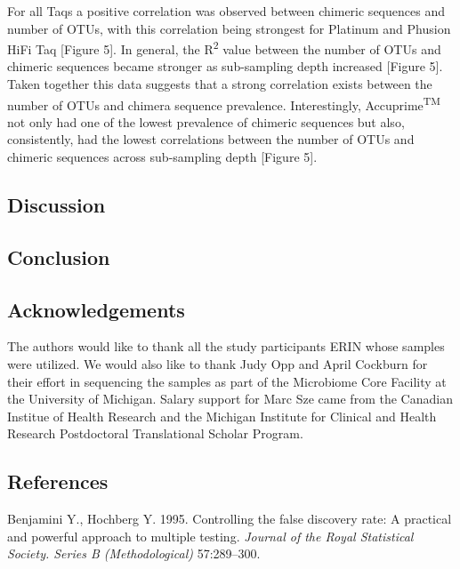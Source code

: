 \documentclass[12pt,]{article}
\begin{document}
For all Taqs a positive correlation was observed between chimeric
sequences and number of OTUs, with this correlation being strongest for
Platinum and Phusion HiFi Taq {[}Figure 5{]}. In general, the
R\textsuperscript{2} value between the number of OTUs and chimeric
sequences became stronger as sub-sampling depth increased {[}Figure
5{]}. Taken together this data suggests that a strong correlation exists
between the number of OTUs and chimera sequence prevalence.
Interestingly, Accuprime\textsuperscript{TM} not only had one of the
lowest prevalence of chimeric sequences but also, consistently, had the
lowest correlations between the number of OTUs and chimeric sequences
across sub-sampling depth {[}Figure 5{]}.

\newpage

\subsection{Discussion}\label{discussion}

\newpage

\subsection{Conclusion}\label{conclusion}

\newpage

\subsection{Acknowledgements}\label{acknowledgements}

The authors would like to thank all the study participants ERIN whose
samples were utilized. We would also like to thank Judy Opp and April
Cockburn for their effort in sequencing the samples as part of the
Microbiome Core Facility at the University of Michigan. Salary support
for Marc Sze came from the Canadian Institue of Health Research and the
Michigan Institute for Clinical and Health Research Postdoctoral
Translational Scholar Program.

\newpage

\subsection{References}\label{references}

\hypertarget{refs}{}
\hypertarget{ref-benjamini_controlling_1995}{}
Benjamini Y., Hochberg Y. 1995. Controlling the false discovery rate: A
practical and powerful approach to multiple testing. \emph{Journal of
the Royal Statistical Society. Series B (Methodological)} 57:289--300.
\end{document}
